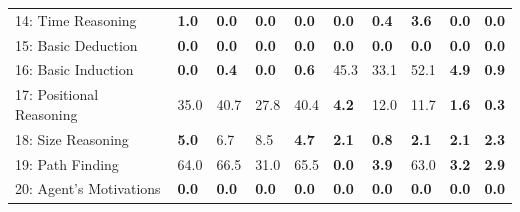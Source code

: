 \documentclass[twoside,ms]{snuthesis_utf8}
\begin{document}
\begin{table}[h]
\begin{adjustbox}{max width=0.95\textwidth}
\begin{tabular}{l|llllllll>{\columncolor[gray]{0.8}}l}
14: Time Reasoning                   & \textbf{1.0}                       &\textbf{0.0}                        & \textbf{0.0}                         &\textbf {0.0}                     & \textbf{0.0}                      & \textbf{0.4} & \textbf{3.6}                      &\textbf{0.0}                    & \textbf{0.0}                    \\
15: Basic Deduction                  & \textbf{0.0}                       & \textbf{0.0}                        &\textbf{0.0}                         & \textbf{0.0}                    &\textbf{0.0}                    & \textbf{0.0}                     &\textbf{0.0}                        & \textbf{0.0}                   &\textbf{0.0}                     \\
16: Basic Induction                  &\textbf{0.0}                       & \textbf{0.4}                        & \textbf{0.0}                         & \textbf{0.6}                   & 45.3                     & 33.1                    & 52.1                       & \textbf{4.9}                   & \textbf{0.9}                    \\
17: Positional Reasoning             & 35.0                        & 40.7                       & 27.8                        & 40.4                    & \textbf{4.2}                      & 12.0                    & 11.7                       & \textbf{1.6}                    & \textbf{0.3} \\
18: Size Reasoning                   & \textbf{5.0}                      & 6.7                        & 8.5                         & \textbf{4.7}                     & \textbf{2.1}                     & \textbf{0.8}                     & \textbf{2.1}                        & \textbf{2.1}                    & \textbf{2.3}                     \\
19: Path Finding                     & 64.0                      & 66.5                       & 31.0                        & 65.5                    & \textbf{0.0}                      & \textbf{3.9}                     & 63.0                       & \textbf{3.2}                    & \textbf{2.9}                     \\
20: Agent's Motivations              & \textbf{0.0}                       & \textbf{0.0}                        & \textbf{0.0} & \textbf{0.0}                    &\textbf{ 0.0}                      & \textbf{0.0}                     & \textbf{0.0}                        &\textbf{0.0}                    & \textbf{0.0}                     \\ \hline

\end{tabular}
\end{adjustbox}
\end{table}
\end{document}
